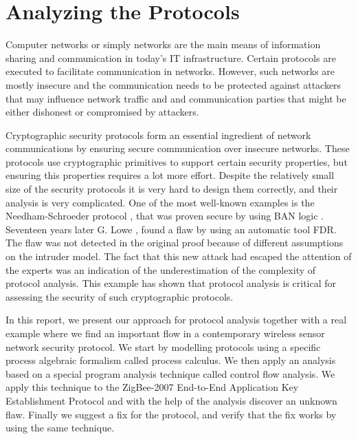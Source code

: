 \chapter{Analyzing the Protocols}
\label{chapter:3}
Computer networks or simply networks are the main means of information
sharing and communication in today's IT infrastructure. Certain
protocols are executed to facilitate communication in
networks. However, such networks are mostly insecure and the
communication needs to be protected against attackers that may
influence network traffic and and communication parties that might be either dishonest or compromised by attackers.

Cryptographic security protocols form an essential ingredient of
network communications by ensuring secure communication over insecure
networks. These protocols use cryptographic primitives to support
certain security properties, but ensuring this properties requires a
lot more effort. Despite the relatively small size of the security
protocols it is very hard to design them correctly, and their analysis
is very complicated. One of the most well-known examples is the
Needham-Schroeder protocol \cite{nee:sch}, that was proven secure by using  BAN
logic \cite{ban}. Seventeen years later G. Lowe \cite{lowe:96,lowe:2}, found a flaw by
using an automatic tool FDR. The flaw was not detected in the
original proof because of different assumptions on the intruder
model. The fact that this new attack had escaped the attention of the experts was an indication of the underestimation of the
complexity of protocol analysis. This example has shown that protocol
analysis is critical for assessing the security of such cryptographic
protocols.

In this report, we present our approach for protocol
analysis together with a real example where we find an important flow
in a contemporary wireless sensor network security protocol. We start
by modelling protocols using a specific process algebraic formalism
called \LYSA process calculus. We then apply an analysis based on a
special program analysis technique called control flow analysis. We
apply this technique to the ZigBee-2007 End-to-End Application Key Establishment Protocol and with the help of the analysis discover
an unknown flaw. Finally we suggest a fix for the protocol, and verify
that the fix works by using the same technique.

